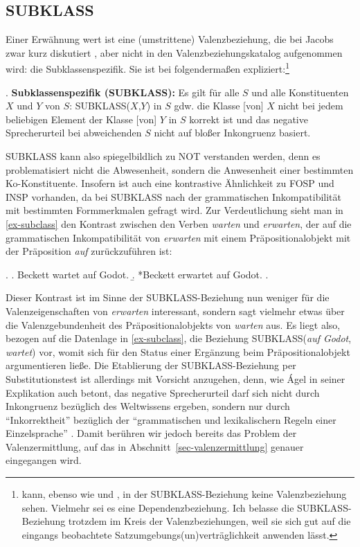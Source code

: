 \subsection{SUBKLASS}

Einer Erwähnung wert ist eine (umstrittene) Valenzbeziehung, die bei Jacobs zwar kurz diskutiert \citep[26]{Jacobs:94}, aber nicht in den Valenzbeziehungskatalog aufgenommen wird: die Subklassenspezifik. Sie ist bei \citet[187]{Agel:00} folgenderma\ss en expliziert:\footnote{\citet[190f]{Agel:00} kann, ebenso wie \cite{Jacobs:94} und \cite{Vater:78},  in der SUBKLASS-Beziehung keine Valenzbeziehung sehen. Vielmehr sei es eine Dependenzbeziehung. Ich belasse die SUBKLASS-Beziehung trotzdem im Kreis der Valenzbeziehungen, weil sie sich gut auf die eingangs beobachtete Satzumgebungs(un)verträglichkeit anwenden lässt.}

\ex. {\bf Subklassenspezifik (SUBKLASS):}  Es gilt für alle $S$ und alle Konstituenten $X$ und $Y$ von $S$: SUBKLASS($X$,$Y$) in $S$ gdw. die Klasse [von] $X$ nicht bei jedem beliebigen Element der Klasse [von] $Y$ in $S$ korrekt ist und das negative Sprecherurteil bei abweichenden $S$ nicht auf blo\ss er Inkongruenz basiert. 

SUBKLASS kann also spiegelbildlich zu NOT verstanden werden, denn es problematisiert nicht die Abwesenheit, sondern die Anwesenheit einer bestimmten Ko-Konstituente. Insofern ist auch eine kontrastive Ähnlichkeit zu FOSP und INSP vorhanden, da bei SUBKLASS nach der grammatischen Inkompatibilität mit bestimmten Formmerkmalen gefragt wird. Zur Verdeutlichung sieht man in \ref{ex-subclass} den Kontrast zwischen den Verben {\it warten} und {\it erwarten}, der auf die grammatischen Inkompatibilität von {\it erwarten} mit einem Präpositionalobjekt mit der Präposition {\it auf} zurückzuführen ist:  

\ex. \label{ex-subclass}
\a. Beckett wartet auf Godot.
\b. *Beckett erwartet auf Godot.
\z. \citep[187]{Agel:00}

Dieser Kontrast ist im Sinne der SUBKLASS-Beziehung nun weniger für die Valenzeigenschaften von {\it erwarten} interessant, sondern sagt vielmehr etwas über die Valenzgebundenheit des Präpositionalobjekts von {\it warten} aus. Es liegt also, bezogen auf die Datenlage in \ref{ex-subclass}, die Beziehung SUBKLASS({\it auf Godot}, {\it wartet}) vor, womit sich für den Status einer Ergänzung beim Präpositionalobjekt argumentieren lie\ss e. Die Etablierung der SUBKLASS-Beziehung per Substitutionstest ist allerdings mit Vorsicht anzugehen, denn, wie \'Agel in seiner Explikation auch betont, das negative Sprecherurteil darf sich nicht durch Inkongruenz bezüglich des Weltwissens ergeben, sondern nur durch "`Inkorrektheit"' bezüglich der "`grammatischen und lexikalischern Regeln einer Einzelsprache"' \citep[188]{Agel:00}. Damit berühren wir jedoch bereits das Problem der Valenzermittlung, auf das in Abschnitt~\ref{sec-valenzermittlung} genauer eingegangen wird.

